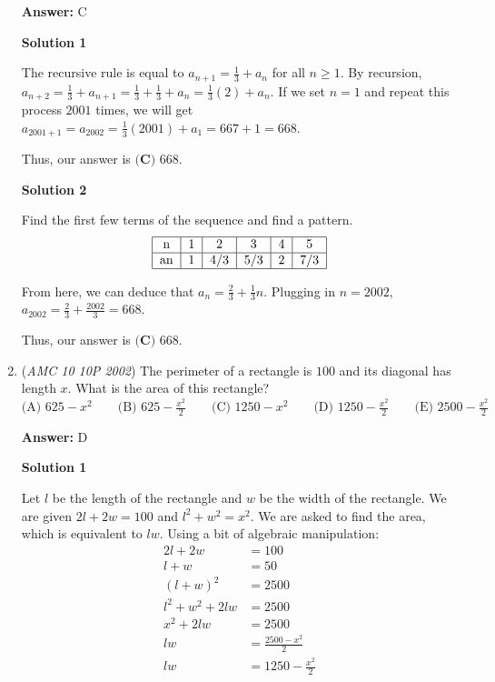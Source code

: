 \begin{enumerate}
 \textbf{Answer: }C



\textbf{Solution 1}

The recursive rule is equal to $a_{n+1}=\frac{1}{3}+a_{n}$ for all $n \geq 1.$ By recursion, $a_{n+2}=\frac{1}{3}+a_{n+1}=\frac{1}{3}+\frac{1}{3}+a_n=\frac{1}{3}(2)+a_n.$ If we set $n=1$ and repeat this process $2001$ times, we will get $a_{2001+1}=a_{2002}=\frac{1}{3}(2001) + a_1=667+1=668.$

 Thus, our answer is $\boxed{\textbf{(C) } 668}.$




\textbf{Solution 2}

Find the first few terms of the sequence and find a pattern.
 \[\begin{tabular}{|c|c|c|c|c|c|}  \hline   n & 1 & 2 & 3 & 4 & 5 \\   \hline  an & 1 & 4/3 & 5/3 & 2 & 7/3 \\  \hline \end{tabular}\]

 From here, we can deduce that $a_n=\frac{2}{3}+\frac{1}{3}n.$ Plugging in $n=2002,$ $a_{2002}=\frac{2}{3}+\frac{2002}{3}=668.$

 Thus, our answer is $\boxed{\textbf{(C) } 668}.$



	\item (\textit{AMC 10 10P 2002}) The perimeter of a rectangle is $100$ and its diagonal has length $x.$ What is the area of this rectangle?
$\text{(A) }625-x^2 \qquad \text{(B) }625-\frac{x^2}{2} \qquad \text{(C) }1250-x^2 \qquad \text{(D) }1250-\frac{x^2}{2} \qquad \text{(E) }2500-\frac{x^2}{2}$

 \textbf{Answer: }D



\textbf{Solution 1}

Let $l$ be the length of the rectangle and $w$ be the width of the rectangle. We are given $2l+2w=100$ and $l^2+w^2=x^2.$ We are asked to find the area, which is equivalent to $lw.$ Using a bit of algebraic manipulation:
 \begin{align*} 2l+2w &= 100 \\ l+w &= 50 \\ (l+w)^2 &= 2500 \\ l^2 + w^2 +2lw &= 2500 \\ x^2 + 2lw &= 2500 \\ lw &= \frac{2500-x^2}{2} \\ lw &= 1250 - \frac{x^2}{2} \\ \end{align*}



\end{enumerate}
